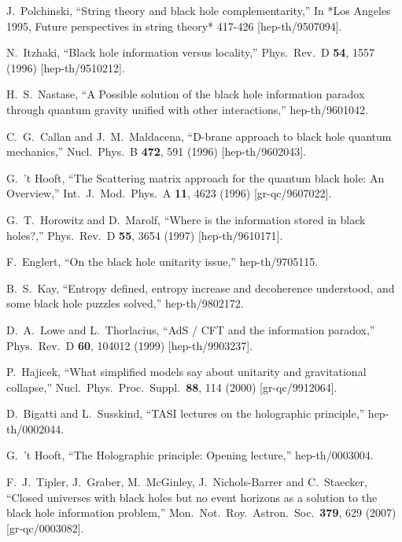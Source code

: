 \documentclass[12pt]{article}
\begin{document}
\begin{thebibliography}{99}
  J.~Polchinski,
  ``String theory and black hole complementarity,''
  In *Los Angeles 1995, Future perspectives in string theory* 417-426
  [hep-th/9507094].

  N.~Itzhaki,
  ``Black hole information versus locality,''
  Phys.\ Rev.\ D {\bf 54}, 1557 (1996)
  [hep-th/9510212].  

  H.~S.~Nastase,
  ``A Possible solution of the black hole information paradox through quantum gravity unified with other interactions,''
  hep-th/9601042.

  C.~G.~Callan and J.~M.~Maldacena,
  ``D-brane approach to black hole quantum mechanics,''
  Nucl.\ Phys.\ B {\bf 472}, 591 (1996)
  [hep-th/9602043].

  G.~'t Hooft,
  ``The Scattering matrix approach for the quantum black hole: An Overview,''
  Int.\ J.\ Mod.\ Phys.\ A {\bf 11}, 4623 (1996)
  [gr-qc/9607022].

  G.~T.~Horowitz and D.~Marolf,
  ``Where is the information stored in black holes?,''
  Phys.\ Rev.\ D {\bf 55}, 3654 (1997)
  [hep-th/9610171].

  F.~Englert,
  ``On the black hole unitarity issue,''
  hep-th/9705115.

  B.~S.~Kay,
  ``Entropy defined, entropy increase and decoherence understood, and some black hole puzzles solved,''
  hep-th/9802172.

  D.~A.~Lowe and L.~Thorlacius,
  ``AdS / CFT and the information paradox,''
  Phys.\ Rev.\ D {\bf 60}, 104012 (1999)
  [hep-th/9903237].

  P.~Hajicek,
  ``What simplified models say about unitarity and gravitational collapse,''
  Nucl.\ Phys.\ Proc.\ Suppl.\  {\bf 88}, 114 (2000)
  [gr-qc/9912064].

  D.~Bigatti and L.~Susskind,
  ``TASI lectures on the holographic principle,''
  hep-th/0002044.

  G.~'t Hooft,
  ``The Holographic principle: Opening lecture,''
  hep-th/0003004.

  F.~J.~Tipler, J.~Graber, M.~McGinley, J.~Nichols-Barrer and C.~Staecker,
  ``Closed universes with black holes but no event horizons as a solution to the black hole information problem,''
  Mon.\ Not.\ Roy.\ Astron.\ Soc.\  {\bf 379}, 629 (2007)
  [gr-qc/0003082].


\end{thebibliography}
\end{document}
